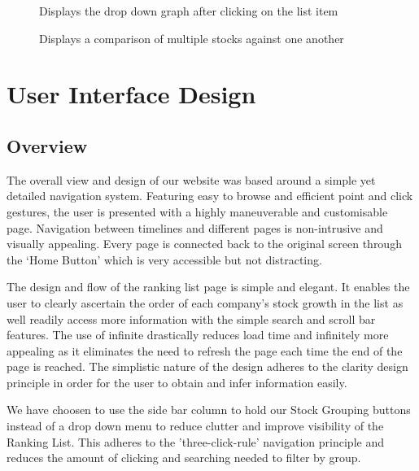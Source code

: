 \documentclass[11pt]{article}
\numberwithin{figure}{section}
\begin{document}
    \begin{figure}[htp]
        \centering
        \caption{Displays the drop down graph after clicking on the list item}
        \label{fig:stockExpandDgram}
    \end{figure}
    
    \begin{figure}[htp]
        \centering
        \caption{Displays a comparison of multiple stocks against one another}
        \label{fig:compareStockDgram}
    \end{figure}
    \clearpage
    
\section{User Interface Design}
    \subsection{Overview}    
        The overall view and design of our website was based around a simple yet detailed navigation system. Featuring easy to browse and efficient point and click gestures, the user is presented with a highly maneuverable and customisable page. Navigation between timelines and different pages is non-intrusive and visually appealing. Every page is connected back to the original screen through the ‘Home Button’ which is very accessible but not distracting.

        \bigskip
        \noindent
        The design and flow of the ranking list page is simple and elegant. It enables the user to clearly ascertain the order of each company’s stock growth in the list as well readily access more information with the simple search and scroll bar features. The use of infinite drastically reduces load time and infinitely more appealing as it eliminates the need to refresh the page each time the end of the page is reached. The simplistic nature of the design adheres to the clarity design principle in order for the user to obtain and infer information easily. 
        
        \bigskip
        \noindent
        We have choosen to use the side bar column to hold our Stock Grouping buttons instead of a drop down menu to reduce clutter and improve visibility of the Ranking List. This adheres to the 'three-click-rule' navigation principle and reduces the amount of clicking and searching needed to filter by group.
        
\end{document}

